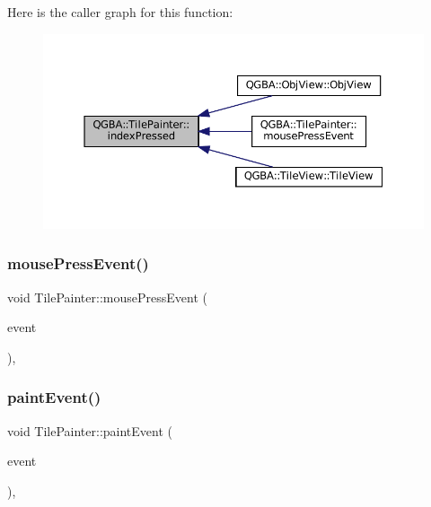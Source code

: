 Here is the caller graph for this function\+:
\nopagebreak
\begin{figure}[H]
\begin{center}
\leavevmode
\includegraphics[width=350pt]{class_q_g_b_a_1_1_tile_painter_a34b9051af2008b7d2274a5a5d0183b95_icgraph}
\end{center}
\end{figure}
\mbox{\label{class_q_g_b_a_1_1_tile_painter_a4ba56bba1679a154a5074160ceffe9c0}} 
\subsubsection{\texorpdfstring{mouse\+Press\+Event()}{mousePressEvent()}}
{\footnotesize\ttfamily void Tile\+Painter\+::mouse\+Press\+Event (\begin{DoxyParamCaption}\item[{Q\+Mouse\+Event $\ast$}]{event }\end{DoxyParamCaption})\hspace{0.3cm}{\ttfamily [override]}, {\ttfamily [protected]}}

\mbox{\label{class_q_g_b_a_1_1_tile_painter_a9a08558b55b33d441d09b53d3c91c473}} 
\subsubsection{\texorpdfstring{paint\+Event()}{paintEvent()}}
{\footnotesize\ttfamily void Tile\+Painter\+::paint\+Event (\begin{DoxyParamCaption}\item[{Q\+Paint\+Event $\ast$}]{event }\end{DoxyParamCaption})\hspace{0.3cm}{\ttfamily [override]}, {\ttfamily [protected]}}

